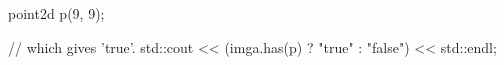 point2d p(9, 9);

// which gives 'true'.
std::cout << (imga.has(p) ? "true" : "false") << std::endl;
